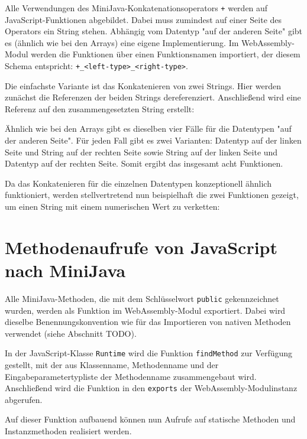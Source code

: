 Alle Verwendungen des MiniJava-Konkatenationsoperators \lstinline{+} werden auf JavaScript-Funktionen abgebildet. Dabei muss zumindest auf einer Seite des Operators ein String stehen. Abhängig vom Datentyp "auf der anderen Seite" gibt es (ähnlich wie bei den Arrays) eine eigene Implementierung. Im WebAssembly-Modul werden die Funktionen über einen Funktionsnamen importiert, der diesem Schema entspricht: \lstinline{+_<left-type>_<right-type>}.

Die einfachste Variante ist das Konkatenieren von zwei Strings. Hier werden zunächst die Referenzen der beiden Strings dereferenziert. Anschließend wird eine Referenz auf den zusammengesetzten String erstellt:


Ähnlich wie bei den Arrays gibt es dieselben vier Fälle für die Datentypen "auf der anderen Seite". Für jeden Fall gibt es zwei Varianten: Datentyp auf der linken Seite und String auf der rechten Seite sowie String auf der linken Seite und Datentyp auf der rechten Seite. Somit ergibt das insgesamt acht Funktionen.

Da das Konkatenieren für die einzelnen Datentypen konzeptionell ähnlich funktioniert, werden stellvertretend nun beispielhaft die zwei Funktionen gezeigt, um einen String mit einem numerischen Wert zu verketten:


\section{Methodenaufrufe von JavaScript nach MiniJava}

Alle MiniJava-Methoden, die mit dem Schlüsselwort \lstinline{public} gekennzeichnet wurden, werden als Funktion im WebAssembly-Modul exportiert. Dabei wird dieselbe Benennungskonvention wie für das Importieren von nativen Methoden verwendet (siehe Abschnitt TODO).

In der JavaScript-Klasse \lstinline{Runtime} wird die Funktion \lstinline{findMethod} zur Verfügung gestellt, mit der aus Klassenname, Methodenname und der Eingabeparametertypliste der Methodenname zusammengebaut wird. Anschließend wird die Funktion in den \lstinline{exports} der WebAssembly-Modulinstanz abgerufen.



Auf dieser Funktion aufbauend können nun Aufrufe auf statische Methoden und Instanzmethoden realisiert werden.

